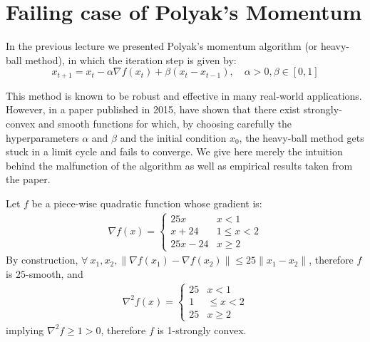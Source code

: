 \documentclass{article}
\begin{document}
\section{Failing case of Polyak's Momentum}
In the previous lecture we presented Polyak's momentum algorithm (or heavy-ball method), in which the iteration step is given by:
\begin{equation} \label{eq:1}
	x_{t+1} = x_t - \alpha \nabla f(x_t) + \beta (x_t - x_{t-1}), \quad  \alpha > 0, \beta \in [0,1]
\end{equation}

This method is known to be robust and effective in many real-world applications. However, in a paper published in 2015, \citet{2014arXiv1408.3595L} have shown that there exist strongly-convex and smooth functions for which, by choosing carefully the hyperparameters $\alpha$ and $\beta$ and the initial condition $x_0$, the heavy-ball method gets stuck in a limit cycle and fails to converge. We give here merely the intuition behind the malfunction of the algorithm as well as empirical results taken from the paper.

\vspace{2ex}

Let $f$ be a piece-wise quadratic function whose gradient is:
\begin{gather}
	\nabla f(x) =  \begin{cases}
    25x &   x < 1 \\
    x+24   &  1 \leq x < 2 \\
    25x-24 & x \geq 2
\end{cases}
\end{gather}
By construction,  $\forall \ x_1, x_2, \|\nabla f(x_1)-\nabla f(x_2)\| \leq 25\|x_1 - x_2\|$, therefore $f$ is $25$-smooth, and 
\begin{gather}
\nabla^2 f(x) =
\begin{cases}
    25 &  x < 1 \\
    1   &  \leq x < 2 \\
    25 & x\geq 2
\end{cases}
\end{gather}
implying $\nabla^2 f \geq 1>0$, therefore $f$ is 1-strongly convex.\\
\end{document}
